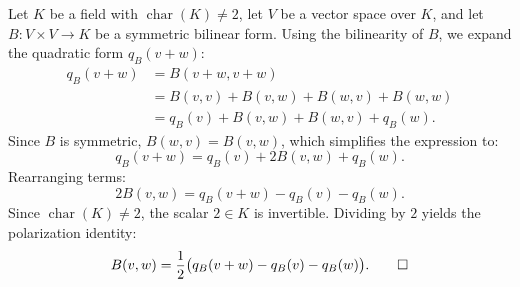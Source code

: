 \begin{exercisesolution}
\label{sol:polarization_quadratic_forms_series26}
Let $K$ be a field with $\operatorname{char}(K) \neq 2$, let $V$ be a vector space over $K$, and let $B \colon V \times V \to K$ be a symmetric bilinear form.
Using the bilinearity of $B$, we expand the quadratic form $q_B(v + w)$:
\begin{align*}
q_B(v + w) &= B(v + w, v + w) \\
&= B(v, v) + B(v, w) + B(w, v) + B(w, w) \\
&= q_B(v) + B(v, w) + B(w, v) + q_B(w).
\end{align*}
Since $B$ is symmetric, $B(w, v) = B(v, w)$, which simplifies the expression to:
\[
q_B(v + w) = q_B(v) + 2 B(v, w) + q_B(w).
\]
Rearranging terms:
\[
2 B(v, w) = q_B(v + w) - q_B(v) - q_B(w).
\]
Since $\operatorname{char}(K) \ne 2$, the scalar $2 \in K$ is invertible. Dividing by $2$ yields the polarization identity:
\[
B(v, w) = \frac{1}{2} \big( q_B(v + w) - q_B(v) - q_B(w) \big). \qedhere
\]
\end{exercisesolution}


